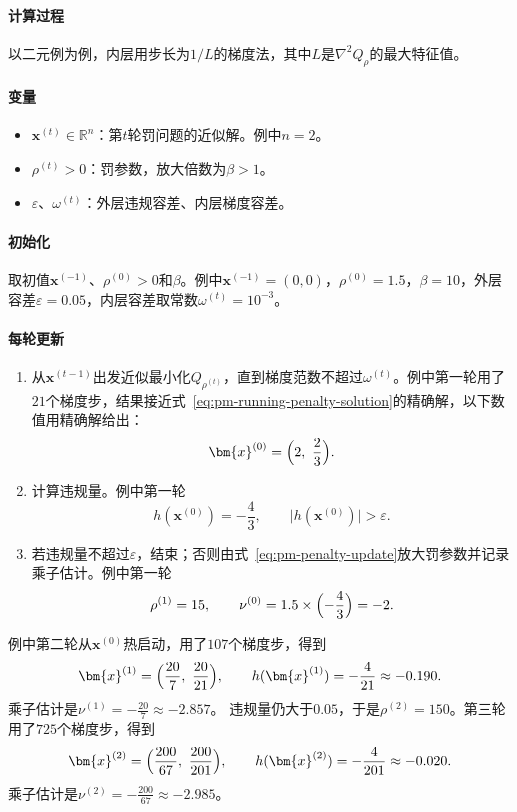 \paragraph{计算过程}
以二元例为例，内层用步长为$1/L$的梯度法，其中$L$是$\nabla^2Q_\rho$的最大特征值。

\paragraph{变量}
\begin{itemize}
 \item $\bm{x}^{(t)}\in\mathbb{R}^n$：第$t$轮罚问题的近似解。例中$n=2$。
 \item $\rho^{(t)}>0$：罚参数，放大倍数为$\beta>1$。
 \item $\varepsilon$、$\omega^{(t)}$：外层违规容差、内层梯度容差。
\end{itemize}

\paragraph{初始化}
取初值$\bm{x}^{(-1)}$、$\rho^{(0)}>0$和$\beta$。例中$\bm{x}^{(-1)}=(0,0)$，$\rho^{(0)}=1.5$，$\beta=10$，外层容差$\varepsilon=0.05$，内层容差取常数$\omega^{(t)}=10^{-3}$。

\paragraph{每轮更新}
\begin{enumerate}
 \item 从$\bm{x}^{(t-1)}$出发近似最小化$Q_{\rho^{(t)}}$，直到梯度范数不超过$\omega^{(t)}$。例中第一轮用了$21$个梯度步，结果接近式~\eqref{eq:pm-running-penalty-solution}的精确解，以下数值用精确解给出：
 \[
  \bm{x}^{(0)}=\Bigl(2,\ \frac23\Bigr).
 \]

 \item 计算违规量。例中第一轮
 \[
  h(\bm{x}^{(0)})=-\frac43,\qquad \lvert h(\bm{x}^{(0)})\rvert>\varepsilon .
 \]
 \item 若违规量不超过$\varepsilon$，结束；否则由式~\eqref{eq:pm-penalty-update}放大罚参数并记录乘子估计。例中第一轮
 \[
  \rho^{(1)}=15,\qquad \nu^{(0)}=1.5\times\Bigl(-\frac43\Bigr)=-2 .
 \]
\end{enumerate}
例中第二轮从$\bm{x}^{(0)}$热启动，用了$107$个梯度步，得到
\[
 \bm{x}^{(1)}=\Bigl(\frac{20}{7},\ \frac{20}{21}\Bigr),\qquad
 h(\bm{x}^{(1)})=-\frac{4}{21}\approx-0.190 .
\]
乘子估计是$\nu^{(1)}=-\tfrac{20}{7}\approx-2.857$。
违规量仍大于$0.05$，于是$\rho^{(2)}=150$。第三轮用了$725$个梯度步，得到
\[
 \bm{x}^{(2)}=\Bigl(\frac{200}{67},\ \frac{200}{201}\Bigr),\qquad
 h(\bm{x}^{(2)})=-\frac{4}{201}\approx-0.020 .
\]
乘子估计是$\nu^{(2)}=-\tfrac{200}{67}\approx-2.985$。


